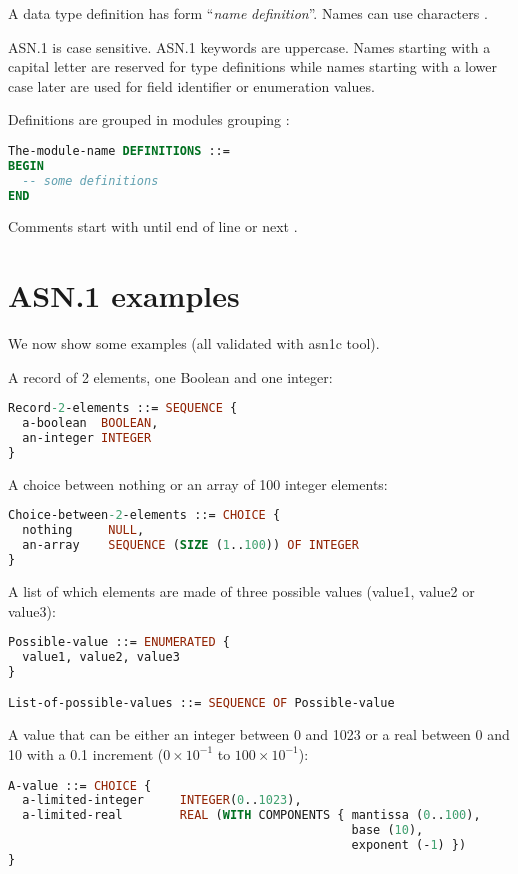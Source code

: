 A data type definition has form ``\emph{name} \ASN{::=}
\emph{definition}''. Names can use characters .

ASN.1 is case sensitive. ASN.1 keywords are uppercase. Names starting
with a capital letter are reserved for type definitions while names
starting with a lower case later are used for field identifier or
enumeration values.

Definitions are grouped in modules grouping
:
\begin{lstlisting}[language=ASN1]
The-module-name DEFINITIONS ::=
BEGIN
  -- some definitions
END
\end{lstlisting}

Comments start with \ASN{--} until end of line or next \ASN{--}.

\section{ASN.1 examples}

We now show some examples (all validated with asn1c tool).

A record of 2 elements, one Boolean and one integer:
\begin{lstlisting}[language=ASN1]
Record-2-elements ::= SEQUENCE {
  a-boolean  BOOLEAN,
  an-integer INTEGER
}
\end{lstlisting}

A choice between nothing or an array of 100 integer elements:
\begin{lstlisting}[language=ASN1]
Choice-between-2-elements ::= CHOICE {
  nothing     NULL,
  an-array    SEQUENCE (SIZE (1..100)) OF INTEGER
}
\end{lstlisting}

A list of which elements are made of three possible values (value1,
value2 or value3):
\begin{lstlisting}[language=ASN1]
Possible-value ::= ENUMERATED {
  value1, value2, value3
}

List-of-possible-values ::= SEQUENCE OF Possible-value
\end{lstlisting}

A value that can be either an integer between 0 and 1023 or a real
between 0 and 10 with a 0.1 increment ($0 \times 10^{-1}$ to $100
\times 10^{-1}$):
\begin{lstlisting}[language=ASN1]
A-value ::= CHOICE {
  a-limited-integer     INTEGER(0..1023),
  a-limited-real        REAL (WITH COMPONENTS { mantissa (0..100),
                                                base (10),
                                                exponent (-1) })
}
\end{lstlisting}


